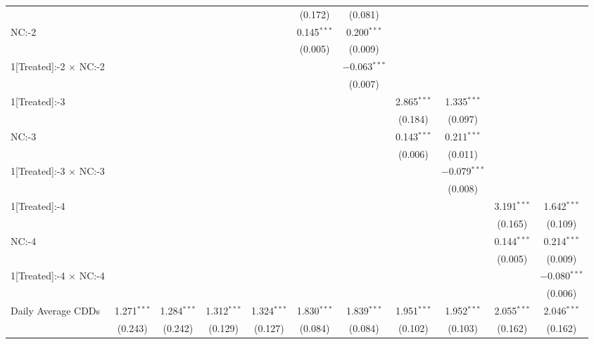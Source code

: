 \begin{table}[!htbp]
\begin{adjustbox}{scale = 0.75}
\begin{tabular}{@{\extracolsep{5pt}}lcccccccccc}
  &  &  &  &  & (0.172) & (0.081) &  &  &  &  \\ 
 NC:-2 &  &  &  &  & 0.145$^{***}$ & 0.200$^{***}$ &  &  &  &  \\ 
  &  &  &  &  & (0.005) & (0.009) &  &  &  &  \\ 
 1[Treated]:-2 $\times$ NC:-2 &  &  &  &  &  & $-$0.063$^{***}$ &  &  &  &  \\ 
  &  &  &  &  &  & (0.007) &  &  &  &  \\ 
 1[Treated]:-3 &  &  &  &  &  &  & 2.865$^{***}$ & 1.335$^{***}$ &  &  \\ 
  &  &  &  &  &  &  & (0.184) & (0.097) &  &  \\ 
 NC:-3 &  &  &  &  &  &  & 0.143$^{***}$ & 0.211$^{***}$ &  &  \\ 
  &  &  &  &  &  &  & (0.006) & (0.011) &  &  \\ 
 1[Treated]:-3 $\times$ NC:-3 &  &  &  &  &  &  &  & $-$0.079$^{***}$ &  &  \\ 
  &  &  &  &  &  &  &  & (0.008) &  &  \\ 
 1[Treated]:-4 &  &  &  &  &  &  &  &  & 3.191$^{***}$ & 1.642$^{***}$ \\ 
  &  &  &  &  &  &  &  &  & (0.165) & (0.109) \\ 
 NC:-4 &  &  &  &  &  &  &  &  & 0.144$^{***}$ & 0.214$^{***}$ \\ 
  &  &  &  &  &  &  &  &  & (0.005) & (0.009) \\ 
 1[Treated]:-4 $\times$ NC:-4 &  &  &  &  &  &  &  &  &  & $-$0.080$^{***}$ \\ 
  &  &  &  &  &  &  &  &  &  & (0.006) \\ 
 Daily Average CDDs & 1.271$^{***}$ & 1.284$^{***}$ & 1.312$^{***}$ & 1.324$^{***}$ & 1.830$^{***}$ & 1.839$^{***}$ & 1.951$^{***}$ & 1.952$^{***}$ & 2.055$^{***}$ & 2.046$^{***}$ \\ 
  & (0.243) & (0.242) & (0.129) & (0.127) & (0.084) & (0.084) & (0.102) & (0.103) & (0.162) & (0.162) \\ 

\end{tabular}
\end{adjustbox}
\end{table}
